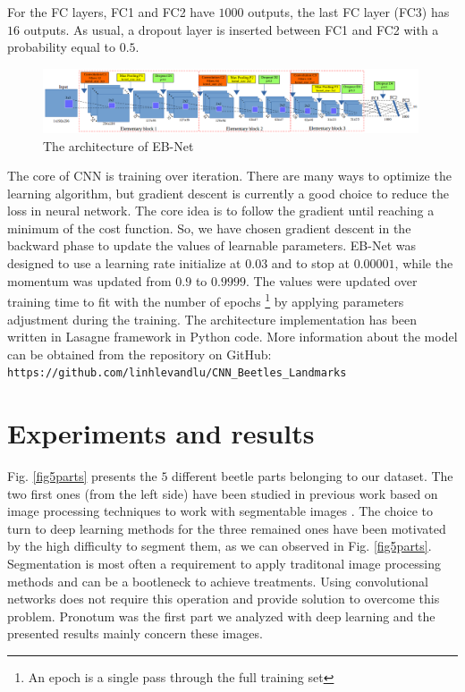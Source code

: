 \documentclass[review]{elsarticle}
\begin{document}
For the FC layers, FC1 and FC2 have $1000$ outputs, the last FC layer (FC3) has $16$ outputs. As usual, a dropout layer is inserted between FC1 and FC2 with a probability equal to $0.5$.

\begin{figure}[h]
	\centering
	\includegraphics[width=0.99\textwidth]{images/net3}
	\caption{The architecture of EB-Net}
	\label{fignet3}
\end{figure}

The core of CNN is training over iteration. There are many ways to
optimize the learning algorithm, but gradient descent
\cite{lecun2012efficient} is currently a good choice to reduce the
loss in neural network. The core idea is to follow the gradient until
reaching a minimum of the cost function. So, we have chosen gradient
descent in the backward phase to update the values of learnable
parameters. EB-Net was designed to use a learning rate initialize at
$0.03$ and to stop at $0.00001$, while the momentum was updated from
$0.9$ to $0.9999$. The values were updated over training time to fit
with the number of epochs \footnote{An epoch is a single pass through
  the full training set} by applying parameters adjustment during the
training. The architecture implementation has been written in Lasagne
framework \cite{lasagne} in Python code. More information about the
model can be obtained from the repository on GitHub:
\texttt{https://github.com/linhlevandlu/CNN\_Beetles\_Landmarks}

\section{Experiments and results}
\label{sexperiments}
Fig. \ref{fig5parts} presents the $5$ different beetle parts belonging
to our dataset. The two first ones (from the left side) have been
studied in previous work based on image processing techniques
to work with segmentable images \cite{le2017maelab}. The choice to
turn to deep learning methods for the three remained ones have
been motivated by the high difficulty to segment them, as we can
observed in Fig. \ref{fig5parts}. Segmentation is most often a
requirement to apply traditonal image processing methods and can be a
bootleneck to achieve treatments. Using convolutional networks does not
require this operation and provide solution to overcome this
problem. Pronotum was the first part we analyzed with deep learning and the presented results mainly concern
these images.
\end{document}
